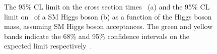 \begin{figure}
  \begin{center}

 \caption{The 95\% \ac{CL} limit on the cross section times \BRinv\, (a) and the 95\% \ac{CL} limit on \BRinv\, of a SM Higgs boson (b) as a function of the Higgs boson mass, assuming SM Higgs boson acceptances. The green and yellow bands indicate the 68\% and 95\% confidence intervals on the expected limit respectively~\cite{CMS-PAS-HIG-14-038}.}
    \label{fig:parkedlimits}
  \end{center}
\end{figure}

